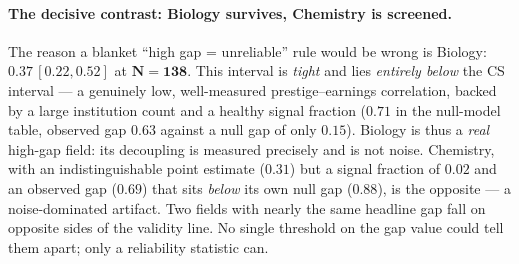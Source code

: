 \documentclass[11pt]{article}
\begin{document}
\paragraph{The decisive contrast: Biology survives, Chemistry is screened.}
The reason a blanket ``high gap = unreliable'' rule would be wrong is Biology: $\mathbf{0.37\,[0.22,0.52]}$ at $\mathbf{N=138}$. This interval is \emph{tight} and lies \emph{entirely below} the CS interval --- a genuinely low, well-measured prestige--earnings correlation, backed by a large institution count and a healthy signal fraction ($0.71$ in the null-model table, observed gap $0.63$ against a null gap of only $0.15$). Biology is thus a \emph{real} high-gap field: its decoupling is measured precisely and is not noise. Chemistry, with an indistinguishable point estimate ($0.31$) but a signal fraction of $0.02$ and an observed gap ($0.69$) that sits \emph{below} its own null gap ($0.88$), is the opposite --- a noise-dominated artifact. Two fields with nearly the same headline gap fall on opposite sides of the validity line. No single threshold on the gap value could tell them apart; only a reliability statistic can.
\end{document}
